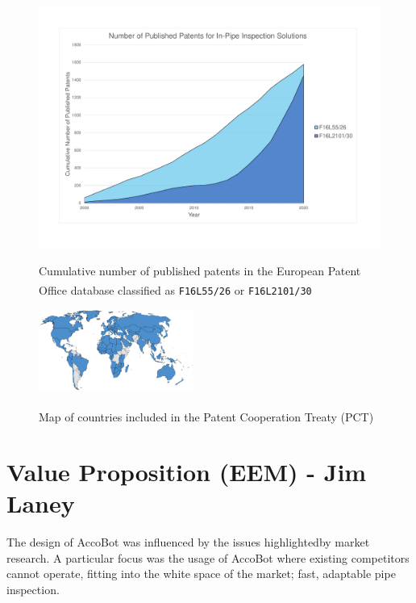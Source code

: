 \documentclass[11pt]{article}		%
\newlength{\imageheight}	 %
\newcommand{\supercite}[1]{\textsuperscript{\cite{#1}}}		%
\begin{document}
		\begin{figure}[h]
			\centering
			\begin{multicols}{2}
				\includegraphics[height=\imageheight]{patentGraph}
				\caption{Cumulative number of published patents in the European Patent Office database classified as \texttt{F16L55/26}\supercite{patent26} or \texttt{F16L2101/30}\supercite{patent30}}
				\label{patentGraph}
				\columnbreak
				\includegraphics[width=0.45\textwidth]{pctMap}
				\caption{Map of countries included in the Patent Cooperation Treaty (PCT)\supercite{pct2020states}}
				\label{pctMap}
			\end{multicols}
		\end{figure}
	
	\section[Value Proposition - EEM]{Value Proposition (EEM) - Jim Laney} \label{solutionEvaluation}
	
		The design of AccoBot was influenced by the issues highlightedby market research.
		A particular focus was the usage of AccoBot where existing competitors cannot operate, fitting into the white space of the market; fast, adaptable pipe inspection.
		
\end{document}
